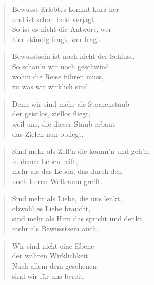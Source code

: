 \documentclass[10pt,a4paper]{article}
\begin{document}
\begin{paracol}{2}
\begin{verse}
Bewusst Erlebtes kommt kurz her \\
und ist schon bald verjagt. \\
So ist es nicht die Antwort, wer \\
hier ständig fragt, wer fragt. \\
\end{verse}

\begin{verse}
Bewusstsein ist noch nicht der Schluss. \\
So schau’n wir noch geschwind \\
wohin die Reise führen muss, \\
zu was wir wirklich sind. \\
\end{verse}

\begin{verse}
Denn wir sind mehr als Sternenstaub \\
der geistlos, ziellos fliegt, \\
weil uns, die dieser Staub erbaut \\
das Zielen nun obliegt. \\
\end{verse}

\begin{verse}
Sind mehr als Zell’n die komm’n und geh’n, \\
in denen Leben reift, \\
mehr als das Leben, das durch den \\
noch leeren Weltraum greift. \\
\end{verse}

\begin{verse}
Sind mehr als Liebe, die uns lenkt, \\
obwohl es Liebe braucht, \\
sind mehr als Hirn das spricht und denkt, \\
mehr als Bewusstsein auch. \\
\end{verse}

\begin{verse}
Wir sind nicht eine Ebene \\
der wahren Wirklichkeit. \\
Nach allem dem gesehenen \\
sind wir für uns bereit. \\
\end{verse}


\end{paracol}
\end{document}
